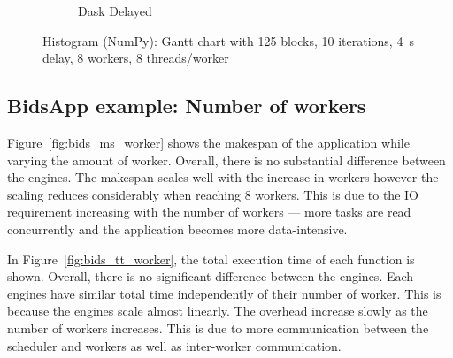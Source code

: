 \documentclass[conference]{IEEEtran}
\begin{document}
\begin{figure}[!htb]
\begin{subfigure}[b]{\columnwidth}
        \caption{Dask Delayed}\label{fig:histo_np_dask_delayed_gantt}
    \end{subfigure}
    \caption{Histogram (NumPy): Gantt chart with 125 blocks, 10 iterations, \SI{4}{\second}
delay, 8 workers, 8 threads/worker}\label{fig:histo_np_gantt}
\end{figure}

\subsection{BidsApp example: Number of workers}
Figure~\ref{fig:bids_ms_worker} shows the makespan of the application while varying
the amount of worker. Overall, there is no substantial difference between the
engines. The makespan scales well with the increase in workers however the scaling
reduces considerably when reaching 8 workers. This is due to the IO requirement
increasing with the number of workers --- more tasks are read concurrently and
the application becomes more data-intensive.

In Figure~\ref{fig:bids_tt_worker}, the total execution time of each function is
shown. Overall, there is no significant difference between the engines. Each engines
have similar total time independently of their number of worker. This is because the
engines scale almost linearly. The overhead increase slowly as the number of workers
increases. This is due to more communication between the scheduler and workers as
well as inter-worker communication.
\end{document}
